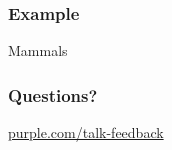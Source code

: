 \begin{frame}
  \frametitle{Example}

  \centerline{Mammals}


  
\end{frame}

\begin{frame}
  \frametitle{Questions?}
  \vspace{3cm}
  \centerline{\large\url{purple.com/talk-feedback}}
\end{frame}




